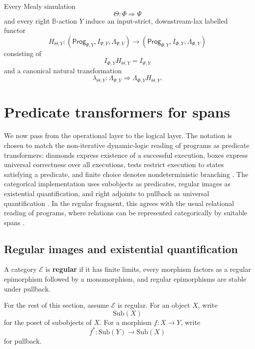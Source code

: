 \begin{corollary}
\label{cor:relative-labelled-functor-simulation}
Every Mealy simulation
\[
\Theta:\Phi\Rightarrow\Psi
\]
and every right \(\mathbb B\)-action \(Y\) induce an input-strict,
downstream-lax labelled functor
\[
H_{\Theta,Y}:
(\mathsf{Prog}_{\Psi,Y},I_{\Psi,Y},\Lambda_{\Psi,Y})
\longrightarrow
(\mathsf{Prog}_{\Phi,Y},I_{\Phi,Y},\Lambda_{\Phi,Y})
\]
consisting of
\[
I_{\Phi,Y}H_{\Theta,Y}=I_{\Psi,Y}
\]
and a canonical natural transformation
\[
\lambda_{\Theta,Y}:
\Lambda_{\Psi,Y}
\Rightarrow
\Lambda_{\Phi,Y}H_{\Theta,Y}.
\]
\end{corollary}

\section{Predicate transformers for spans}
\label{sec:relative-predicate-transformers}

We now pass from the operational layer to the logical layer. The notation is
chosen to match the non-iterative dynamic-logic reading of programs as
predicate transformers: diamonds express existence of a successful execution,
boxes express universal correctness over all executions, tests restrict
execution to states satisfying a predicate, and finite choice denotes
nondeterministic branching \cite{HarelKozenTiurynDynamicLogic}. The
categorical implementation uses subobjects as predicates, regular images as
existential quantification, and right adjoints to pullback as universal
quantification \cite{Jacobs1999CategoricalLogic}. In the regular fragment,
this agrees with the usual relational reading of programs, where relations can
be represented categorically by suitable spans
\cite{FongSpivakRegularRelational}.

\subsection{Regular images and existential quantification}
\label{subsec:relative-regular-images}

\begin{definition}
\label{def:relative-regular-category}
A category \(\mathcal E\) is \textbf{regular} if it has finite limits, every
morphism factors as a regular epimorphism followed by a monomorphism, and
regular epimorphisms are stable under pullback.
\end{definition}

For the rest of this section, assume \(\mathcal E\) is regular. For an object
\(X\), write
\[
\mathrm{Sub}(X)
\]
for the poset of subobjects of \(X\). For a morphism \(f:X\to Y\), write
\[
f^\ast:\mathrm{Sub}(Y)\to\mathrm{Sub}(X)
\]
for pullback.

